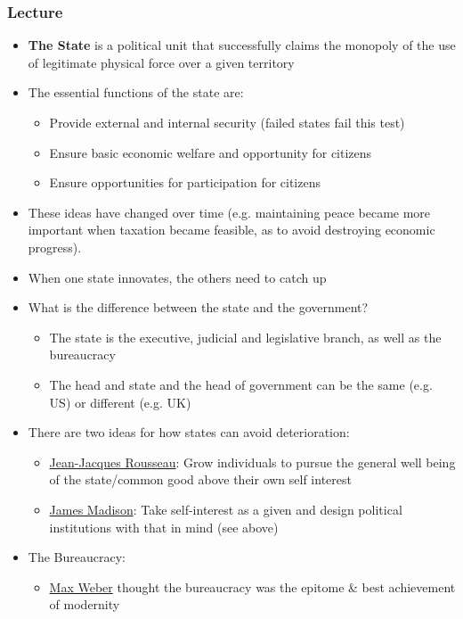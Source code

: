 \documentclass[11pt]{article}
\begin{document}
\subsubsection{Lecture}
\label{sec:orgcda1946}
\begin{itemize}
\item \textbf{The State} is a political unit that successfully claims the
  monopoly of the use of legitimate physical force over a given territory
\item The essential functions of the state are:
\begin{itemize}
\item Provide external and internal security (failed states fail this test)
\item Ensure basic economic welfare and opportunity for citizens
\item Ensure opportunities for participation for citizens
\end{itemize}
\item These ideas have changed over time (e.g. maintaining peace became more
important when taxation became feasible, as to avoid destroying economic
progress).
\item When one state innovates, the others need to catch up
\item What is the difference between the state and the government?
\begin{itemize}
\item The state is the executive, judicial and legislative branch, as well as the
bureaucracy
\item The head and state and the head of government can be the same (e.g. US) or
different (e.g. UK)
\end{itemize}
\item There are two ideas for how states can avoid deterioration:
\begin{itemize}
\item \href{20200622130556-jean\_jacques\_rousseau.org}{Jean-Jacques Rousseau}: Grow individuals to pursue the general well being of
the state/common good above their own self interest
\item \href{20200428175548-james\_madison.org}{James Madison}: Take self-interest as a given and design political
institutions with that in mind (see above)
\end{itemize}
\item The Bureaucracy:
\begin{itemize}
\item \href{Max Weber.org}{Max Weber} thought the bureaucracy was the epitome \& best achievement of modernity

\end{itemize}
\end{itemize}
\end{document}
